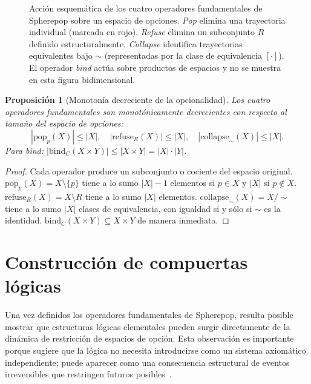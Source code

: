\documentclass[12pt]{article}
\theoremstyle{plain}
\newtheorem{proposition}[theorem]{Proposición}
\theoremstyle{definition}
\begin{document}
\begin{figure}[ht]
\caption{Acción esquemática de los cuatro operadores fundamentales de Spherepop sobre un espacio de opciones. \emph{Pop} elimina una trayectoria individual (marcada en rojo). \emph{Refuse} elimina un subconjunto $R$ definido estructuralmente. \emph{Collapse} identifica trayectorias equivalentes bajo $\sim$ (representadas por la clase de equivalencia $[\cdot]$). El operador \emph{bind} actúa sobre productos de espacios y no se muestra en esta figura bidimensional.}
\label{fig:operadores}
\end{figure}

\begin{proposition}[Monotonía decreciente de la opcionalidad]
\label{prop:monotonia}
Los cuatro operadores fundamentales son monotónicamente decrecientes con respecto al tamaño del espacio de opciones:
\[
|\mathrm{pop}_p(X)| \leq |X|, \quad
|\mathrm{refuse}_R(X)| \leq |X|, \quad
|\mathrm{collapse}_\sim(X)| \leq |X|.
\]
Para \emph{bind}: $|\mathrm{bind}_C(X \times Y)| \leq |X \times Y| = |X| \cdot |Y|$.
\end{proposition}

\begin{proof}
Cada operador produce un subconjunto o cociente del espacio original. $\mathrm{pop}_p(X) = X \setminus \{p\}$ tiene a lo sumo $|X| - 1$ elementos si $p \in X$ y $|X|$ si $p \notin X$. $\mathrm{refuse}_R(X) = X \setminus R$ tiene a lo sumo $|X|$ elementos. $\mathrm{collapse}_\sim(X) = X/{\sim}$ tiene a lo sumo $|X|$ clases de equivalencia, con igualdad si y sólo si $\sim$ es la identidad. $\mathrm{bind}_C(X \times Y) \subseteq X \times Y$ de manera inmediata.
\end{proof}

\section{Construcción de compuertas lógicas}
\label{sec:logica}

Una vez definidos los operadores fundamentales de Spherepop, resulta posible mostrar que estructuras lógicas elementales pueden surgir directamente de la dinámica de restricción de espacios de opción. Esta observación es importante porque sugiere que la lógica no necesita introducirse como un sistema axiomático independiente; puede aparecer como una consecuencia estructural de eventos irreversibles que restringen futuros posibles~\cite{girard,abramsky}.
\end{document}

